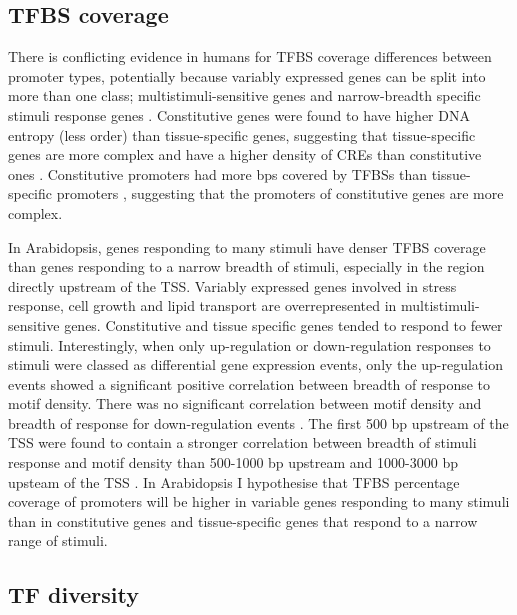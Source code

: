 \documentclass[../main.tex]{subfiles}
\begin{document}
\subsection{TFBS coverage}
\label{chapter1:introduction:tfbs-coverage}

There is conflicting evidence in humans for TFBS coverage differences between promoter types, potentially because variably expressed genes can be split into more than one class; multistimuli-sensitive genes and narrow-breadth specific stimuli response genes \autocite{waltherRegulatoryCodeTranscriptional2007}.
Constitutive genes were found to have higher DNA entropy (less order) than tissue-specific genes, suggesting that tissue-specific genes are more complex and have a higher density of CREs than constitutive ones \autocite{thomasDNAEntropyReveals2015}. 
Constitutive promoters had more bps covered by TFBSs than tissue-specific promoters \autocite{mattioliHighthroughputFunctionalAnalysis2019}, suggesting that the promoters of constitutive genes are more complex.

In Arabidopsis, genes responding to many stimuli have denser TFBS coverage than genes responding to a narrow breadth of stimuli, especially in the region directly upstream of the TSS.
Variably expressed genes involved in stress response, cell growth and lipid transport are overrepresented in multistimuli-sensitive genes.
Constitutive and tissue specific genes tended to respond to fewer stimuli.
Interestingly, when only up-regulation or down-regulation responses to stimuli were classed as differential gene expression events, only the up-regulation events showed a significant positive correlation between breadth of response to motif density.
There was no significant correlation between motif density and breadth of response for down-regulation events \autocite{waltherRegulatoryCodeTranscriptional2007}.
The first 500 bp upstream of the TSS were found to contain a stronger correlation between breadth of stimuli response and motif density than 500-1000 bp upstream and 1000-3000 bp upsteam of the TSS \autocite{waltherRegulatoryCodeTranscriptional2007}.
In Arabidopsis I hypothesise that TFBS percentage coverage of promoters will be higher in variable genes responding to many stimuli than in constitutive genes and tissue-specific genes that respond to a narrow range of stimuli.

\subsection{TF diversity}
\label{chapter1:introduction:tf-diversity}
\end{document}
